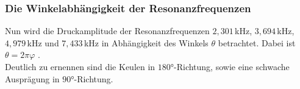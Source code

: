 \subsubsection{Die Winkelabhängigkeit der Resonanzfrequenzen}
Nun wird die Druckamplitude der Resonanzfrequenzen $2,301\,$kHz, $3,694\,$kHz, $4,979\,$kHz und $7,433\,$kHz 
in Abhängigkeit des Winkels $\theta$ betrachtet. Dabei ist $\theta = 2 \pi \varphi$ . \\
Deutlich zu ernennen sind die Keulen in $180°$-Richtung, sowie eine schwache Ausprägung in $90°$-Richtung.


\begin{figure}[H]
    \centering
    \hfil
    \hfil 
    

\end{figure}
